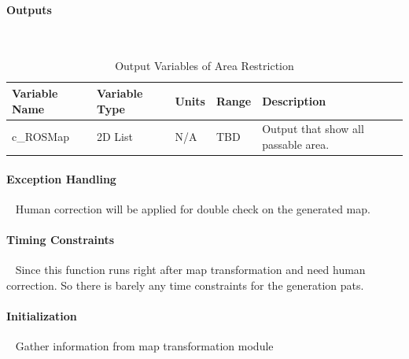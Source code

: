 \documentclass[12pt]{article}
\begin{document}
            \paragraph{Outputs}
                ~\newline
                \begin{table}[H]
                  \centering
                    \caption{Output Variables of Area Restriction} 
                    \label{tbl:Output Variables of Area Restriction}
                  \begin{tabularx}{\textwidth}{|p{5cm}|p{1.2cm}|p{1.2cm}|p{1cm}|X|}
                    \hline Variable Name & Variable Type & Units & Range & Description \\
                    \hline c\_ROSMap & 2D List & N/A & TBD & Output that show all passable area.\\
                    \hline
                  \end{tabularx}
                \end{table}
                
            \paragraph{Exception Handling}
                ~\newline
                Human correction will be applied for double check on the generated map. \\
                
            \paragraph{Timing Constraints}
                ~\newline
                Since this function runs right after map transformation and need human correction. So there is barely any time constraints for the generation pats. \\
            \paragraph{Initialization}
                ~\newline
                Gather information from map transformation module\\
                
\end{document}
